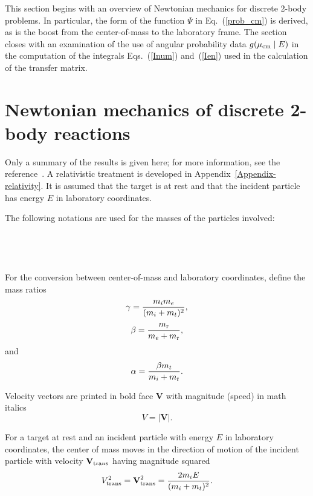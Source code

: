This section begins with an overview of Newtonian mechanics
for discrete 2-body problems.  In particular, the form of the function
$\Psi$ in Eq.~(\ref{prob_cm}) is derived, as is the boost from the
center-of-mass to the laboratory frame.  The section closes
with an examination of the use of angular probability data 
$g( \mu_{\text{cm}} \mid E)$ in the computation of the integrals
Eqs.~(\ref{Inum}) and~(\ref{Ien}) used in the calculation of the
transfer matrix.  

\section{Newtonian mechanics of discrete 2-body reactions}
\label{Sec:2-body-Newton}
Only a summary of the results is given here; for more information,
see the reference~\cite{endep}.  A relativistic treatment is
developed in Appendix~\ref{Appendix-relativity}.  It is assumed that the target is at rest 
and that the incident particle has
energy $E$ in laboratory coordinates.

The following
notations are used for the masses of the particles involved:\\
 \\
 \\
 \\
 \\
For the conversion
between center-of-mass and laboratory coordinates, define
the mass ratios
$$
  \gamma = \frac
    { m_i m_e }
    { ( m_i + m_t )^2 },
$$
$$
   \beta = \frac
    { m_{\text{r}} }
    { m_e + m_{\text{r}} },
$$
and
$$
   \alpha = \frac
    {\beta m_t}
    { m_i + m_t }.
$$

Velocity vectors are printed in bold face $\textbf{V}$ with
magnitude (speed) in math italics
$$
  V = | \textbf{V} |.
$$

For a target at rest and an incident particle with
energy $E$ in laboratory coordinates, the center of mass
moves in the direction of motion of
the incident particle with velocity $\textbf{V}_{\text{trans}}$ having magnitude squared 
\begin{equation}
  V_{\text{trans}}^2 = \textbf{V}_{\text{trans}}^2 =
    \frac{ 2m_i  E}
    { ( m_i + m_t )^2 }.
  \label{Vtrans-length}
\end{equation}

